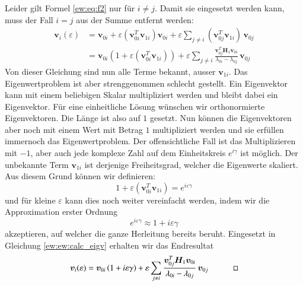 Leider gilt Formel \eqref{ew:eq:f2} nur für $i \neq j$. Damit sie eingesetzt werden kann, muss der Fall $i = j$ aus der Summe entfernt werden:
\begin{align}
    \bm v_i(\varepsilon)
    &=
    \bm v_{0i} + \varepsilon \left( \bm v_{0i}^T \bm v_{1i} \right) \bm v_{0i} + \varepsilon \sum_{j \neq i} \left(\bm v_{0j}^T \bm v_{1i} \right) \, \bm v_{0j} \\
    &=
    \bm v_{0i} \left( 1 + \varepsilon(\bm v_{0i}^T \bm v_{1i}) \right) + \varepsilon \sum_{j \neq i}
    \frac{\bm v_{0j}^T \bm H_1 \bm v_{0i}}{\lambda_{0i} - \lambda_{0j}}
    \, \bm v_{0j} \label{ew:ew:calc_eigv}
\end{align}
Von dieser Gleichung sind nun alle Terme bekannt, ausser $\bm v_{1i}$.
Das Eigenwertproblem ist aber strenggenommen schlecht gestellt.
Ein Eigenvektor kann mit einem beliebigen Skalar multipliziert werden und bleibt dabei ein Eigenvektor.
Für eine einheitliche Lösung wünschen wir orthonormierte Eigenvektoren.
Die Länge ist also auf $1$ gesetzt.
Nun können die Eigenvektoren aber noch mit einem Wert mit Betrag $1$ multipliziert werden und sie erfüllen immernoch das Eigenwertproblem.
Der offensichtliche Fall ist das Multiplizieren mit $-1$, aber auch jede komplexe Zahl auf dem Einheitskreis $e^{i\gamma}$ ist möglich.
Der unbekannte Term $\bm v_{1i}$ ist derjenige Freiheitsgrad, welcher die Eigenwerte skaliert.
Aus diesem Grund können wir definieren:
\begin{equation}
    1 + \varepsilon (\bm v_{0i}^T \bm v_{1i}) = e^{i \varepsilon \gamma}
\end{equation}
und für kleine $\varepsilon$ kann dies noch weiter vereinfacht werden, indem wir die Approximation erster Ordnung
\begin{equation}
    e^{i \varepsilon \gamma} \approx 1 + i \varepsilon \gamma
\end{equation}
akzeptieren, auf welcher die ganze Herleitung bereits beruht.
Eingesetzt in Gleichung \eqref{ew:ew:calc_eigv} erhalten wir das Endresultat
\begin{equation}
    \bm v_i(\varepsilon)
    =
    \bm v_{0i} \left( 1 + i \varepsilon \gamma \right) + \varepsilon \sum_{j \neq i}
    \frac{\bm v_{0j}^T \bm H_1 \bm v_{0i}}{\lambda_{0i} - \lambda_{0j}}
    \, \bm v_{0j}
    \quad
    \qed
    \label{ew:eq:explicit_eigvecs}
\end{equation}

